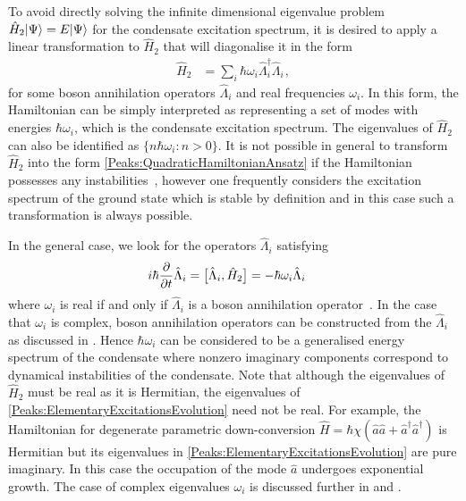 To avoid directly solving the infinite dimensional eigenvalue problem $\hat{H}_2 {\left|\Psi\right>} = E {\left|\Psi\right>}$ for the condensate excitation spectrum, it is desired to apply a linear transformation to $\hat{H}_2$ that will diagonalise it in the form
\begin{align}
    \label{Peaks:QuadraticHamiltonianAnsatz}
    \hat{H}_2 &= \sum_i \hbar \omega_i \hat{\Lambda}_i^\dagger \hat{\Lambda}_i^{\phantom{\dagger}},
\end{align}
for some boson annihilation operators $\hat{\Lambda}_i$ and real frequencies $\omega_i$. In this form, the Hamiltonian can be simply interpreted as representing a set of modes with energies $\hbar \omega_i$, which is the condensate excitation spectrum. The eigenvalues of $\hat{H}_2$ can also be identified as $\{n \hbar \omega_i : n > 0 \}$. It is not possible in general to transform $\hat{H}_2$ into the form \eqref{Peaks:QuadraticHamiltonianAnsatz} if the Hamiltonian possesses any instabilities~\citep{Leonhardt:2003}, however one frequently considers the excitation spectrum of the ground state which is stable by definition and in this case such a transformation is always possible.

In the general case, we look for the operators $\hat{\Lambda}_i$ satisfying
\begin{align}
    \label{Peaks:ElementaryExcitationsEvolution}
    i \hbar \frac{\partial }{\partial t}\hat{\Lambda}_i &= \comm{\hat{\Lambda}_i, \hat{H}_2 } = - \hbar \omega_i \hat{\Lambda}_i
\end{align}
where $\omega_i$ is real if and only if $\hat{\Lambda}_i$ is a boson annihilation operator~\citep{Leonhardt:2003}. In the case that $\omega_i$ is complex, boson annihilation operators can be constructed from the $\hat{\Lambda}_i$ as discussed in . Hence $\hbar\omega_i$ can be considered to be a generalised energy spectrum of the condensate where nonzero imaginary components correspond to dynamical instabilities of the condensate. Note that although the eigenvalues of $\hat{H}_2$ must be real as it is Hermitian, the eigenvalues of \eqref{Peaks:ElementaryExcitationsEvolution} need not be real. For example, the Hamiltonian for degenerate parametric down-conversion $\hat{H} = \hbar\chi \left(\hat{a}\hat{a} + \hat{a}^\dagger \hat{a}^\dagger \right)$ is Hermitian but its eigenvalues in \eqref{Peaks:ElementaryExcitationsEvolution} are pure imaginary. In this case the occupation of the mode $\hat{a}$ undergoes exponential growth. The case of complex eigenvalues $\omega_i$ is discussed further in  and .

